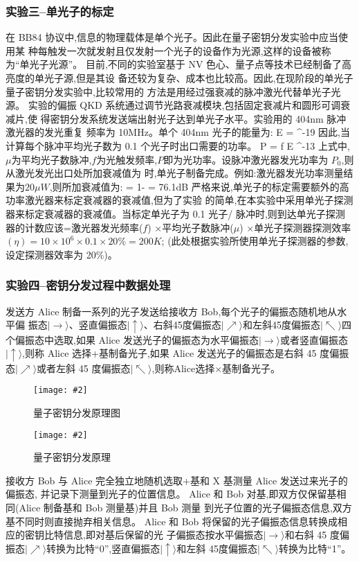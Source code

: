 \documentclass[11pt,a4paper]{ctexart}
\newcommand{\cpic}[2]{
\begin{center}
\texttt{[image: \#2]}
\end{center}
}
\newcommand{\cpicn}[3]
{
\begin{figure}[H]
\cpic{#1}{#2}
\caption{\color{red}#3\label{#2}}
\end{figure}
}
\begin{document}
\subsubsection{实验三--单光子的标定}
在 BB84 协议中,信息的物理载体是单个光子。因此在量子密钥分发实验中应当使用某
种每触发一次就发射且仅发射一个光子的设备作为光源,这样的设备被称为“单光子光源”。
目前,不同的实验室基于 NV 色心、量子点等技术已经制备了高亮度的单光子源,但是其设
备还较为复杂、成本也比较高。因此,在现阶段的单光子量子密钥分发实验中,比较常用的
方法是用经过强衰减的脉冲激光代替单光子光源。
实验的偏振 QKD 系统通过调节光路衰减模块,包括固定衰减片和圆形可调衰减片,使
得密钥分发系统发送端出射光子达到单光子水平。实验用的 404nm 脉冲激光器的发光重复
频率为 10MHz。单个 404nm 光子的能量为:
\beq
E = \hbar \omega {} ^{-19} 
\eeq
因此,当计算每个脉冲平均光子数为 0.1 个光子时出口需要的功率。
\beq
P  =  \mu f E ^{-13}
\eeq
上式中,$\mu$为平均光子数脉冲,$f$为光触发频率,$P$即为光功率。设脉冲激光器发光功率为
$P_0$,则从激光发光出口处所加衰减值为
 \log {}
\ee
时,单光子制备完成。例如:激光器发光功率测量结果为$20\mu W$,则所加衰减值为:
 \log {} = 1- \log {} = 76.1dB
\eeq
严格来说,单光子的标定需要额外的高功率激光器来标定衰减器的衰减值,但为了实验
的简单,在本实验中采用单光子探测器来标定衰减器的衰减值。当标定单光子为 0.1 光子/
脉冲时,则到达单光子探测器的计数应该=激光器发光频率($f$) $\times$平均光子数脉冲($\mu$) $\times$单光子探测器探测效率$(\eta) =10\times10^6 \times0.1\times20\%=200K$;
(此处根据实验所使用单光子探测器的参数,
设定探测器效率为 20\%)。
\subsubsection{实验四--密钥分发过程中数据处理}


发送方 Alice 制备一系列的光子发送给接收方 Bob,每个光子的偏振态随机地从水平偏
振态$|\rightarrow\rangle$、竖直偏振态$|\uparrow\rangle$、右斜45度偏振态$|\nearrow\rangle$和左斜45度偏振态$|\nwarrow\rangle$四个偏振态中选取,如果 Alice 发送光子的偏振态为水平偏振态$|\rightarrow\rangle$或者竖直偏振态$|\uparrow\rangle$,则称 Alice 选择+基制备光子,如果 Alice 发送光子的偏振态是右斜 45 度偏振态$|\nearrow\rangle$或者左斜 45 度偏振态$|\nwarrow\rangle$,则称Alice选择$\times$基制备光子。
\cpicn{0.3}{key1}{量子密钥分发原理图}
\cpicn{0.3}{key2}{量子密钥分发原理}
接收方 Bob 与 Alice 完全独立地随机选取+基和 X 基测量 Alice 发送过来光子的偏振态,
并记录下测量到光子的位置信息。
Alice 和 Bob 对基,即双方仅保留基相同(Alice 制备基和 Bob 测量基)并且 Bob 测量
到光子位置的光子偏振态信息,双方基不同时则直接抛弃相关信息。
Alice 和 Bob 将保留的光子偏振态信息转换成相应的密钥比特信息,即对基后保留的光
子偏振态按水平偏振态$|\rightarrow\rangle$和右斜 45 度偏振态$|\nearrow\rangle$转换为比特“0”,竖直偏振态$|\uparrow\rangle$和左斜 45度偏振态$|\nwarrow\rangle$转换为比特“1”。
\end{document}
